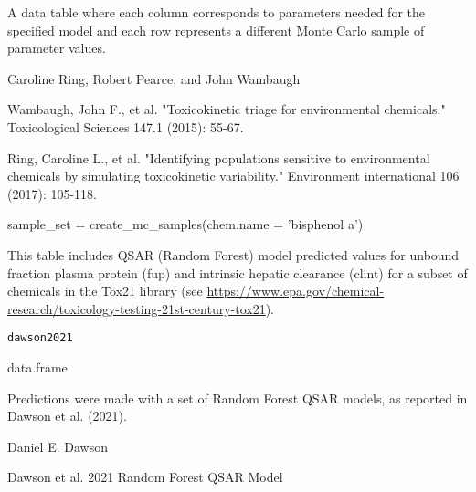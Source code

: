\documentclass[a4paper]{book}
\begin{document}
%
\begin{Value}
A data table where each column corresponds to parameters needed for the 
specified model and each row represents a different Monte Carlo sample of
parameter values.
\end{Value}
%
\begin{Author}\relax
Caroline Ring, Robert Pearce, and John Wambaugh
\end{Author}
%
\begin{References}\relax
Wambaugh, John F., et al. "Toxicokinetic triage for 
environmental chemicals." Toxicological Sciences 147.1 (2015): 55-67.

Ring, Caroline L., et al. "Identifying populations sensitive to
environmental chemicals by simulating toxicokinetic variability."
Environment international 106 (2017): 105-118.
\end{References}
%
\begin{Examples}
\begin{ExampleCode}


sample_set = create_mc_samples(chem.name = 'bisphenol a')


\end{ExampleCode}
\end{Examples}
%
\begin{Description}\relax
This table includes QSAR (Random Forest) model predicted values for unbound
fraction plasma protein (fup) and intrinsic hepatic clearance (clint) for a
subset of chemicals in the Tox21 library
(see \url{https://www.epa.gov/chemical-research/toxicology-testing-21st-century-tox21}).
\end{Description}
%
\begin{Usage}
\begin{verbatim}
dawson2021
\end{verbatim}
\end{Usage}
%
\begin{Format}
data.frame
\end{Format}
%
\begin{Details}\relax
Predictions were made with a set of Random Forest QSAR models,
as reported in Dawson et al. (2021).
\end{Details}
%
\begin{Author}\relax
Daniel E. Dawson
\end{Author}
%
\begin{Source}\relax
Dawson et al. 2021 Random Forest QSAR Model
\end{Source}
\end{document}

